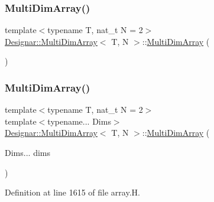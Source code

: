 \subsubsection{\texorpdfstring{Multi\+Dim\+Array()}{MultiDimArray()}\hspace{0.1cm}{\footnotesize\ttfamily [1/4]}}
{\footnotesize\ttfamily template$<$typename T, nat\+\_\+t N = 2$>$ \\
\hyperlink{class_designar_1_1_multi_dim_array}{Designar\+::\+Multi\+Dim\+Array}$<$ T, N $>$\+::\hyperlink{class_designar_1_1_multi_dim_array}{Multi\+Dim\+Array} (\begin{DoxyParamCaption}{ }\end{DoxyParamCaption})\hspace{0.3cm}{\ttfamily [default]}}

\mbox{\label{class_designar_1_1_multi_dim_array_a87e9b411cccc10d39117d1ccdcd66261}} 
\subsubsection{\texorpdfstring{Multi\+Dim\+Array()}{MultiDimArray()}\hspace{0.1cm}{\footnotesize\ttfamily [2/4]}}
{\footnotesize\ttfamily template$<$typename T, nat\+\_\+t N = 2$>$ \\
template$<$typename... Dims$>$ \\
\hyperlink{class_designar_1_1_multi_dim_array}{Designar\+::\+Multi\+Dim\+Array}$<$ T, N $>$\+::\hyperlink{class_designar_1_1_multi_dim_array}{Multi\+Dim\+Array} (\begin{DoxyParamCaption}\item[{Dims...}]{dims }\end{DoxyParamCaption})\hspace{0.3cm}{\ttfamily [inline]}}



Definition at line 1615 of file array.\+H.

\mbox{\label{class_designar_1_1_multi_dim_array_a4dd6166b45028efc4bab7cd42c492663}} 
